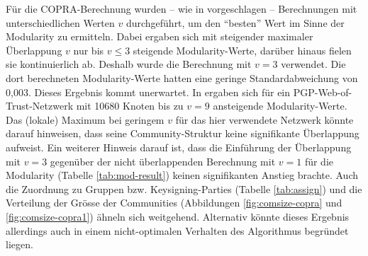 F\"ur die COPRA-Berechnung wurden -- wie in \cite{Gregory2010}
vorgeschlagen -- Berechnungen mit unterschiedlichen Werten $v$
durchgef\"uhrt, um den ``besten'' Wert im Sinne der Modularity zu
ermitteln. Dabei ergaben sich mit steigender maximaler \"Uberlappung
$v$ nur bis $v\le 3$ steigende Modularity-Werte, dar\"uber hinaus
fielen sie kontinuierlich ab. Deshalb wurde die Berechnung mit $v=3$
verwendet. Die dort berechneten Modularity-Werte hatten eine geringe
Standardabweichung von 0,003. Dieses Ergebnis kommt unerwartet. In
\cite{Gregory2010} ergaben sich f\"ur ein PGP-Web-of-Trust-Netzwerk
mit 10680 Knoten bis zu $v=9$ ansteigende Modularity-Werte. Das
(lokale) Maximum bei geringem $v$ f\"ur das hier verwendete Netzwerk
k\"onnte darauf hinweisen, dass seine Community-Struktur keine
signifikante \"Uberlappung aufweist. Ein weiterer Hinweis darauf ist,
dass die Einf\"uhrung der \"Uberlappung mit $v=3$ gegen\"uber der
nicht \"uberlappenden Berechnung mit $v=1$ f\"ur die Modularity
(Tabelle \ref{tab:mod-result}) keinen signifikanten Anstieg
brachte. Auch die Zuordnung zu Gruppen bzw. Keysigning-Parties
(Tabelle \ref{tab:assign}) und die Verteilung der Gr\"osse der
Communities (Abbildungen \ref{fig:comsize-copra} und
\ref{fig:comsize-copra1}) \"ahneln sich weitgehend. Alternativ
k\"onnte dieses Ergebnis allerdings auch in einem nicht-optimalen
Verhalten des Algorithmus begr\"undet liegen.


